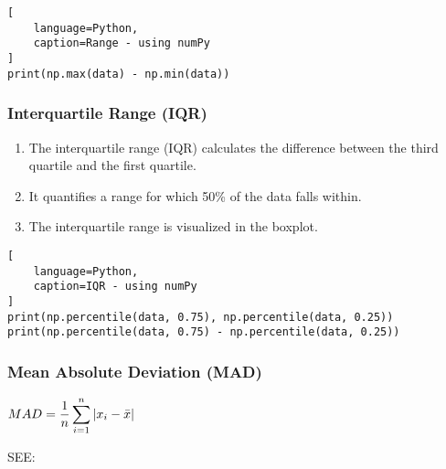 \begin{lstlisting}[
    language=Python,
    caption=Range - using numPy
]
print(np.max(data) - np.min(data))
\end{lstlisting}


\subsubsection{Interquartile Range (IQR) \cite{statistics/book/Statistics-for-Data-Scientists/Maurits-Kaptein}} \label{Data/Describing Data/Central Tendency/Interquartile Range (IQR)}

\begin{enumerate}
    \item The interquartile range (IQR) calculates the difference between the third quartile and the first quartile. \hfill \cite{statistics/book/Statistics-for-Data-Scientists/Maurits-Kaptein}

    \item It quantifies a range for which 50\% of the data falls within. \hfill \cite{statistics/book/Statistics-for-Data-Scientists/Maurits-Kaptein}

    \item The interquartile range is visualized in the boxplot. \hfill \cite{statistics/book/Statistics-for-Data-Scientists/Maurits-Kaptein}
\end{enumerate}

\begin{lstlisting}[
    language=Python,
    caption=IQR - using numPy
]
print(np.percentile(data, 0.75), np.percentile(data, 0.25))
print(np.percentile(data, 0.75) - np.percentile(data, 0.25))
\end{lstlisting}


\subsubsection{Mean Absolute Deviation (MAD) \cite{statistics/book/Statistics-for-Data-Scientists/Maurits-Kaptein}} \label{Data/Describing Data/Central Tendency/Mean Absolute Deviation (MAD)}

$
    MAD
    = \dfrac{1}{n} \displaystyle\sum_{i=1}^{n} \left| x_i - \bar{x} \right|
$ \hfill \cite{statistics/book/Statistics-for-Data-Scientists/Maurits-Kaptein}

\vspace{0.2cm}

SEE: 


